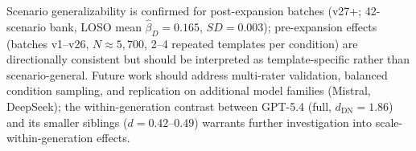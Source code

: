 \documentclass[11pt]{article}
\begin{document}
Scenario generalizability is confirmed for post-expansion batches (v27+; 42-scenario bank, LOSO mean $\hat{\beta}_D=0.165$, $SD=0.003$); pre-expansion effects (batches v1--v26, $N\approx5{,}700$, 2--4 repeated templates per condition) are directionally consistent but should be interpreted as template-specific rather than scenario-general.
Future work should address multi-rater validation, balanced condition sampling, and replication on additional model families (Mistral, DeepSeek); the within-generation contrast between GPT-5.4 (full, $d_\text{DN}=1.86$) and its smaller siblings ($d=0.42$--$0.49$) warrants further investigation into scale-within-generation effects.



\end{document}
